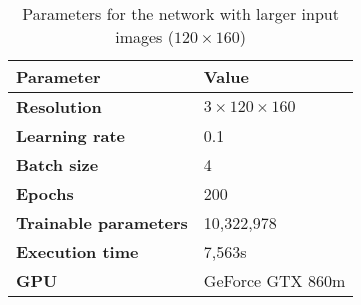 \begin{table}[h!]
	\footnotesize
	\centering
	\begin{tabular}{ll}
	\hline
		\textbf{Parameter} & \textbf{Value}\\
	\hline
	\hline
		\textbf{Resolution} & $3 \times 120\times160$\\
		\textbf{Learning rate} & 0.1\\
		\textbf{Batch size} & 4\\
		\textbf{Epochs} & 200\\
		\textbf{Trainable parameters} & 10,322,978\\
		\textbf{Execution time} & 7,563s\\
		\textbf{GPU} & GeForce GTX 860m\\
	\hline
	\end{tabular}
	\caption{Parameters for the network with larger input images ($120\times160$)}
	\label{tab:params_120_network}
\end{table}
